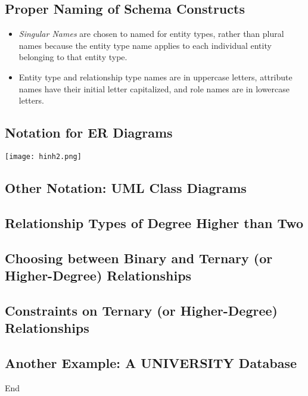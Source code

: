 \documentclass[10pt]{article}
\begin{document}
\subsection{Proper Naming of Schema Constructs}
\begin{itemize}
	\item \textit{Singular Names} are chosen to named for entity types, rather than plural names because the entity type name applies to each individual entity belonging to that entity type.
	\item Entity type and relationship type names are in uppercase letters, attribute names have their initial letter capitalized, and role names are in lowercase letters. 
\end{itemize}

\subsection{Notation for ER Diagrams}
\texttt{[image: hinh2.png]}
\bigbreak

\subsection{Other Notation: UML Class Diagrams}

\subsection{Relationship Types of Degree Higher than Two}
\bigbreak

\subsection{Choosing between Binary and Ternary (or Higher-Degree) Relationships}
\bigbreak

\subsection{Constraints on Ternary (or Higher-Degree) Relationships}
\bigbreak

\subsection{Another Example: A UNIVERSITY Database}
\bigbreak

\begin{center}
	End
\end{center}
\pagebreak
\end{document}
